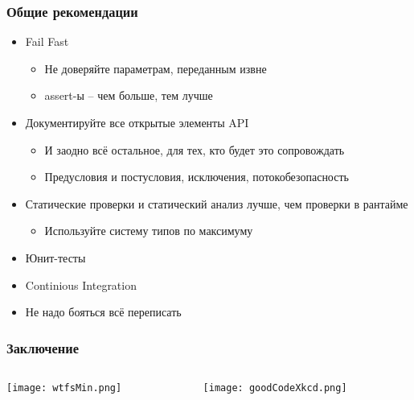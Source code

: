 \documentclass{../../slides-style}
\begin{document}
    \begin{frame}
        \frametitle{Общие рекомендации}
        \begin{itemize}
            \item Fail Fast
            \begin{itemize}
                \item Не доверяйте параметрам, переданным извне
                \item assert-ы -- чем больше, тем лучше
            \end{itemize}
            \item Документируйте все открытые элементы API
            \begin{itemize}
                \item И заодно всё остальное, для тех, кто будет это сопровождать
                \item Предусловия и постусловия, исключения, потокобезопасность
            \end{itemize}
            \item Статические проверки и статический анализ лучше, чем проверки в рантайме
            \begin{itemize}
                \item Используйте систему типов по максимуму
            \end{itemize}
            \item Юнит-тесты
            \item Continious Integration
            \item Не надо бояться всё переписать
        \end{itemize}
    \end{frame}

    \begin{frame}
        \frametitle{Заключение}
        \begin{columns}
            \begin{column}{0.5\textwidth}
                \begin{center}
                    \texttt{[image: wtfsMin.png]}
                \end{center}
                \vspace{-0.8cm}
            \end{column}
            \begin{column}{0.5\textwidth}
                \begin{center}
                    \texttt{[image: goodCodeXkcd.png]}
                \end{center}
                \vspace{-0.8cm}
            \end{column}
        \end{columns}
    \end{frame}
\end{document}
